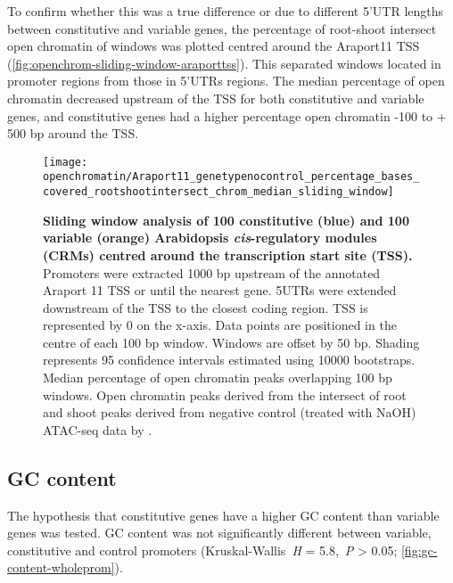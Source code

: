 \documentclass[../main.tex]{subfiles}
\begin{document}
To confirm whether this was a true difference or due to different 5'UTR lengths between constitutive and variable genes, the percentage of root\hyp{}shoot intersect open chromatin of windows was plotted centred around the Araport11 TSS (\autoref{fig:openchrom-sliding-window-araporttss}).
This separated windows located in promoter regions from those in 5'UTRs regions.
The median percentage of open chromatin decreased upstream of the TSS for both constitutive and variable genes, and constitutive genes had a higher percentage open chromatin -100 to + 500 bp around the TSS.



\begin{figure}[!hbt]
	\begin{center}
		\capstart
		\texttt{[image: openchromatin/Araport11\_genetypenocontrol\_percentage\_bases\_covered\_rootshootintersect\_chrom\_median\_sliding\_window]}
		\caption{
			\textbf{Sliding window analysis of 100 constitutive (blue) and 100 variable (orange) Arabidopsis \textit{cis}\hyp{}regulatory modules (CRMs) centred around the transcription start site (TSS).}
			Promoters were extracted 1000 bp upstream of the annotated Araport 11 \autocite{chengAraport11CompleteReannotation2017} TSS or until the nearest gene.
			5UTRs were extended downstream of the TSS to the closest coding region.
			TSS is represented by 0 on the x-axis.
			Data points are positioned in the centre of each 100 bp window.
			Windows are offset by 50 bp.
			Shading represents 95 confidence intervals estimated using 10000 bootstraps.
			Median percentage of open chromatin peaks overlapping 100 bp windows. Open chromatin peaks derived from the intersect of root and shoot peaks derived from negative control (treated with NaOH) ATAC\hyp{}seq data by \textcite{potterCytokininModulatesContextdependent2018}.		
			\label{fig:openchrom-sliding-window-araporttss}
		}
	\end{center}
\end{figure}


\subsection{GC content}
The hypothesis that constitutive genes have a higher GC content than variable genes was tested.
GC content was not significantly different between variable, constitutive and control promoters (Kruskal\hyp{}Wallis~\textit{H} = 5.8,~\textit{P} \textgreater{} 0.05; \autoref{fig:gc-content-wholeprom}).
\end{document}
